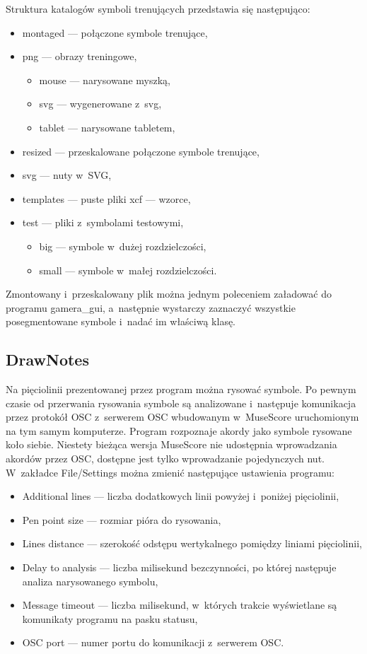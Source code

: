 \documentclass[polish,thesis,12pt]{dcsbook}
\begin{document}
Struktura katalogów symboli trenujących przedstawia się następująco:

\begin{itemize}
  \item montaged --- połączone symbole trenujące,
  \item png --- obrazy treningowe,
        \begin{itemize}
          \item mouse --- narysowane myszką,
          \item svg --- wygenerowane z~svg,
          \item tablet --- narysowane tabletem,
        \end{itemize}
  \item resized --- przeskalowane połączone symbole trenujące,
  \item svg --- nuty w~SVG,
  \item templates --- puste pliki xcf --- wzorce,
  \item test --- pliki z~symbolami testowymi,
        \begin{itemize}
          \item big --- symbole w~dużej rozdzielczości,
          \item small --- symbole w~małej rozdzielczości.
        \end{itemize}
\end{itemize}

Zmontowany i~przeskalowany plik można jednym poleceniem załadować do programu gamera\_gui, a~następnie wystarczy zaznaczyć wszystkie posegmentowane symbole i~nadać im właściwą klasę.

\subsection{DrawNotes}
Na pięciolinii prezentowanej przez program można rysować symbole. Po pewnym czasie od przerwania rysowania symbole są analizowane i~następuje komunikacja przez protokół OSC z~serwerem OSC wbudowanym w~MuseScore uruchomionym na tym samym komputerze. Program rozpoznaje akordy jako symbole rysowane koło siebie. Niestety bieżąca wersja MuseScore nie udostępnia wprowadzania akordów przez OSC, dostępne jest tylko wprowadzanie pojedynczych nut.
W~zakładce File/Settings można zmienić następujące ustawienia programu:

\begin{itemize}
  \item Additional lines --- liczba dodatkowych linii powyżej i~poniżej pięciolinii,
  \item Pen point size --- rozmiar pióra do rysowania,
  \item Lines distance --- szerokość odstępu wertykalnego pomiędzy liniami pięciolinii,
  \item Delay to analysis --- liczba milisekund bezczynności, po której następuje analiza narysowanego symbolu,
  \item Message timeout --- liczba milisekund, w~których trakcie wyświetlane są komunikaty programu na pasku statusu,
  \item OSC port --- numer portu do komunikacji z~serwerem OSC.
\end{itemize}
\end{document}
